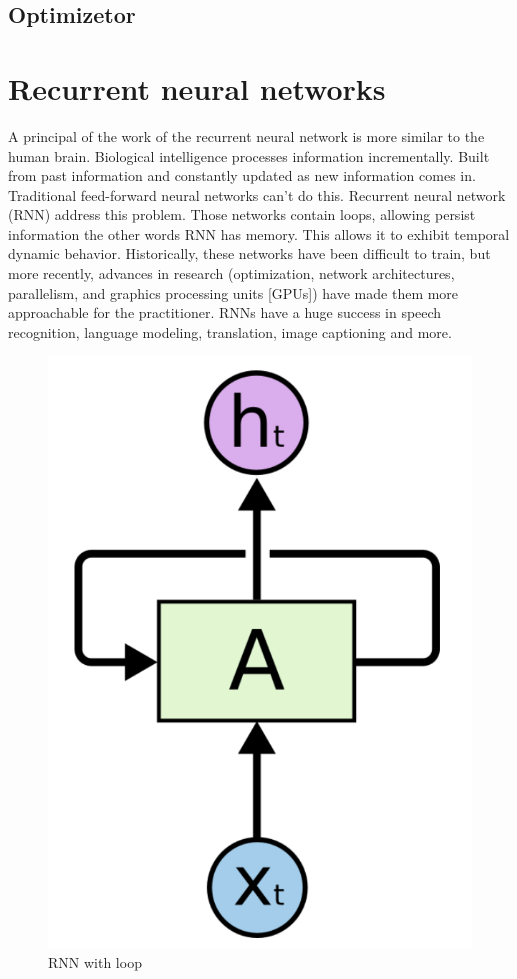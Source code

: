 \documentclass[thesis=M,english]{FITthesis}[2012/10/20]
\begin{document}
\subsection{Optimizetor}



\section{Recurrent neural networks}
A principal of the work of the recurrent neural network is more similar to the human brain. Biological intelligence processes information incrementally. Built from past information and constantly updated as new information comes in. Traditional feed-forward neural networks can't do this. Recurrent neural network (RNN) address this problem. Those networks contain loops, allowing persist information the other words RNN has memory. This allows it to exhibit temporal dynamic behavior. Historically, these networks have been difficult to train, but more recently, advances in research (optimization, network architectures, parallelism, and graphics processing units [GPUs]) have made them more approachable for the practitioner. RNNs have a huge success in speech recognition, language modeling, translation, image captioning and more.


\begin{figure}\centering
	\includegraphics[scale=0.5]{images/RNN_diagram}
	\caption{RNN  with loop}\label{fig:RNN_loop}
\end{figure}
\end{document}
